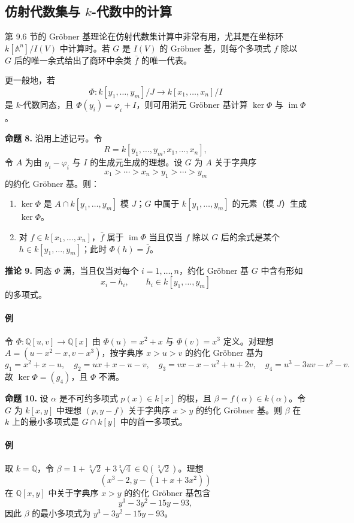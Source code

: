 \subsection*{仿射代数集与 $k$-代数中的计算}

第 9.6 节的 Gröbner 基理论在仿射代数集计算中非常有用，尤其是在坐标环 $k[\mathbb A^n]/I(V)$ 中计算时。若 $G$ 是 $I(V)$ 的 Gröbner 基，则每个多项式 $f$ 除以 $G$ 后的唯一余式给出了商环中余类 $\bar f$ 的唯一代表。

更一般地，若
\[
\Phi:k[y_1,
\ldots,y_m]/J\longrightarrow k[x_1,
\ldots,x_n]/I
\]
是 $k$-代数同态，且 $\Phi(y_i)=\varphi_i+I$，则可用消元 Gröbner 基计算 $\ker\Phi$ 与 $\operatorname{im}\Phi$。

\noindent\textbf{命题 8.} 沿用上述记号。令
\[
R=k[y_1,
\ldots,y_m,x_1,
\ldots,x_n],
\]
令 $A$ 为由 $y_i-
\varphi_i$ 与 $I$ 的生成元生成的理想。设 $G$ 为 $A$ 关于字典序
\[
x_1>\cdots>x_n>y_1>\cdots>y_m
\]
的约化 Gröbner 基。则：
\begin{enumerate}[label=(\alph*)]
	\item $\ker\Phi$ 是 $A\cap k[y_1,
	\ldots,y_m]$ 模 $J$；$G$ 中属于 $k[y_1,
	\ldots,y_m]$ 的元素（模 $J$）生成 $\ker\Phi$。
	\item 对 $f\in k[x_1,
	\ldots,x_n]$，$\bar f$ 属于 $\operatorname{im}\Phi$ 当且仅当 $f$ 除以 $G$ 后的余式是某个 $h\in k[y_1,
	\ldots,y_m]$；此时 $\Phi(h)=\bar f$。
\end{enumerate}

\noindent\textbf{推论 9.} 同态 $\Phi$ 满，当且仅当对每个 $i=1,
\ldots,n$，约化 Gröbner 基 $G$ 中含有形如
\[
x_i-h_i,
\qquad h_i\in k[y_1,
\ldots,y_m]
\]
的多项式。

\paragraph{例}
令 $\Phi:\mathbb Q[u,v]\to\mathbb Q[x]$ 由 $\Phi(u)=x^2+x$ 与 $\Phi(v)=x^3$ 定义。对理想 $A=(u-x^2-x,v-x^3)$，按字典序 $x>u>v$ 的约化 Gröbner 基为
\[
g_1=x^2+x-u,
\quad
g_2=ux+x-u-v,
\quad
g_3=vx-x-u^2+u+2v,
\quad
g_4=u^3-3uv-v^2-v.
\]
故 $\ker\Phi=(g_4)$，且 $\Phi$ 不满。

\noindent\textbf{命题 10.} 设 $\alpha$ 是不可约多项式 $p(x)\in k[x]$ 的根，且 $\beta=f(\alpha)\in k(\alpha)$。令 $G$ 为 $k[x,y]$ 中理想 $(p,y-f)$ 关于字典序 $x>y$ 的约化 Gröbner 基。则 $\beta$ 在 $k$ 上的最小多项式是 $G\cap k[y]$ 中的首一多项式。

\paragraph{例}
取 $k=\mathbb Q$，令 $\beta=1+\sqrt[3]{2}+3\sqrt[3]{4}\in\mathbb Q(\sqrt[3]{2})$。理想
\[
(x^3-2,
y-(1+x+3x^2))
\]
在 $\mathbb Q[x,y]$ 中关于字典序 $x>y$ 的约化 Gröbner 基包含
\[
y^3-3y^2-15y-93,
\]
因此 $\beta$ 的最小多项式为 $y^3-3y^2-15y-93$。


